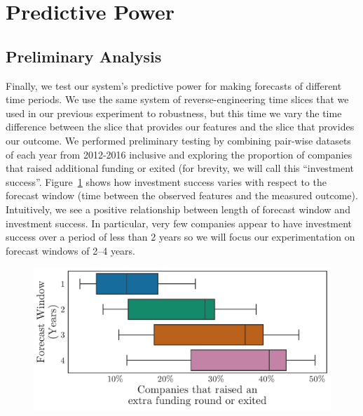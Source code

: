 \documentclass[../thesis/thesis.tex]{subfiles}
\begin{document}
\section{Predictive Power}


\subsection{Preliminary Analysis}

Finally, we test our system's predictive power for making forecasts of different time periods. We use the same system of reverse-engineering time slices that we used in our previous experiment to robustness, but this time we vary the time difference between the slice that provides our features and the slice that provides our outcome.
We performed preliminary testing by combining pair-wise datasets of each year from 2012-2016 inclusive and exploring the proportion of companies that raised additional funding or exited (for brevity, we will call this ``investment success''. Figure~\ref{fig:evaluation:outcome_forecast_window} shows how investment success varies with respect to the forecast window (time between the observed features and the measured outcome). Intuitively, we see a positive relationship between length of forecast window and investment success. In particular, very few companies appear to have investment success over a period of less than 2 years so we will focus our experimentation on forecast windows of 2--4 years.

\begin{figure}[!htb] %
    \centering
    \includegraphics[width=\textwidth]{../figures/evaluation/outcome_forecast_window}
    \caption[Investment success by forecast window]{} 
    \label{fig:evaluation:outcome_forecast_window}
\end{figure}
\end{document}

